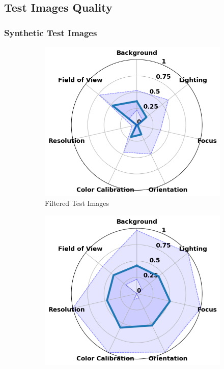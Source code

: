 \subsection{Test Images Quality}
\label{subsec:TestImagesQuality}
\subsubsection{Synthetic Test Images}
\label{subsubsec:SyntheticTestImages}
\begin{figure}[ht]
    \centering
    \begin{subfigure}[b]{0.48\textwidth}
        \includegraphics[width=\textwidth]{img/hept/test_70.png}
        \caption{Filtered Test Images}
        \label{fig:test_70}
    \end{subfigure}
    \hfill
    \begin{subfigure}[b]{0.48\textwidth}
        \includegraphics[width=\textwidth]{img/hept/test_70_synthetic.png}

\end{subfigure}
\end{figure}
